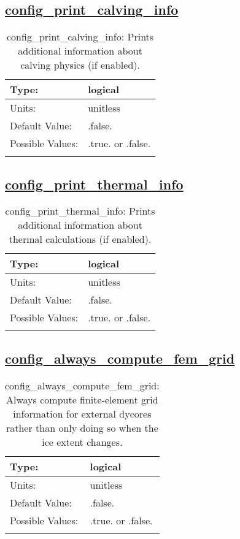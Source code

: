 \subsection[config\_print\_calving\_info]{\hyperref[sec:nm_tab_debug]{config\_print\_calving\_info}}
\label{subsec:nm_sec_config_print_calving_info}
\begin{center}
\begin{longtable}{| p{2.0in} || p{4.0in} |}
    \hline
    Type: & logical \\
    \hline
    Units: & \si{unitless} \\
    \hline
    Default Value: & .false. \\
    \hline
    Possible Values: & .true. or .false. \\
    \hline
    \caption{config\_print\_calving\_info: Prints additional information about calving physics (if enabled).}
\end{longtable}
\end{center}
\subsection[config\_print\_thermal\_info]{\hyperref[sec:nm_tab_debug]{config\_print\_thermal\_info}}
\label{subsec:nm_sec_config_print_thermal_info}
\begin{center}
\begin{longtable}{| p{2.0in} || p{4.0in} |}
    \hline
    Type: & logical \\
    \hline
    Units: & \si{unitless} \\
    \hline
    Default Value: & .false. \\
    \hline
    Possible Values: & .true. or .false. \\
    \hline
    \caption{config\_print\_thermal\_info: Prints additional information about thermal calculations (if enabled).}
\end{longtable}
\end{center}
\subsection[config\_always\_compute\_fem\_grid]{\hyperref[sec:nm_tab_debug]{config\_always\_compute\_fem\_grid}}
\label{subsec:nm_sec_config_always_compute_fem_grid}
\begin{center}
\begin{longtable}{| p{2.0in} || p{4.0in} |}
    \hline
    Type: & logical \\
    \hline
    Units: & \si{unitless} \\
    \hline
    Default Value: & .false. \\
    \hline
    Possible Values: & .true. or .false. \\
    \hline
    \caption{config\_always\_compute\_fem\_grid: Always compute finite-element grid information for external dycores rather than only doing so when the ice extent changes.}
\end{longtable}
\end{center}
